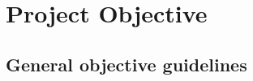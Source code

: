 \documentclass[11pt]{article}
\begin{document}


    \section{Project Objective}\label{sec:project-objective}

    \subsection{General objective guidelines}\label{subsec:general-objective-guidelines}
\end{document}
